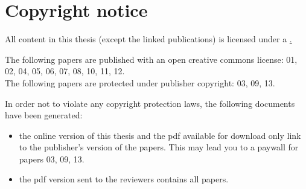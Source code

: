 \section*{Copyright notice}

All content in this thesis (except the linked publications) is licensed 
under a \href{https://creativecommons.org/licenses/by/4.0}.

The following papers are published with an open creative commons license:
01, 02, 04, 05, 06, 07, 08, 10, 11, 12. \\
The following papers are protected under publisher copyright: 03, 09, 13.

In order not to violate any copyright protection laws, the following documents have been generated:
\begin{itemize}
\item the online version of this thesis and the pdf available for download only link to the publisher's 
      version of the papers. This may lead you to a paywall for papers 03, 09, 13.
\item the pdf version sent to the reviewers contains all papers.
\end{itemize}
